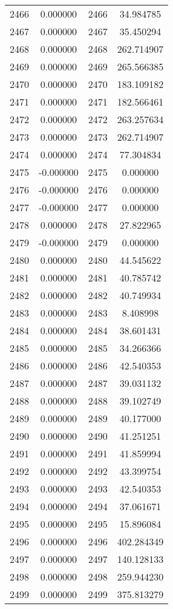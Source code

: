 \documentclass[12pt]{article}
\begin{document}
\begin{longtable}{@{}cccc@{}}
2466 & 0.000000 & 2466 & 34.984785 \\
2467 & 0.000000 & 2467 & 35.450294 \\
2468 & 0.000000 & 2468 & 262.714907 \\
2469 & 0.000000 & 2469 & 265.566385 \\
2470 & 0.000000 & 2470 & 183.109182 \\
2471 & 0.000000 & 2471 & 182.566461 \\
2472 & 0.000000 & 2472 & 263.257634 \\
2473 & 0.000000 & 2473 & 262.714907 \\
2474 & 0.000000 & 2474 & 77.304834 \\
2475 & -0.000000 & 2475 & 0.000000 \\
2476 & -0.000000 & 2476 & 0.000000 \\
2477 & -0.000000 & 2477 & 0.000000 \\
2478 & 0.000000 & 2478 & 27.822965 \\
2479 & -0.000000 & 2479 & 0.000000 \\
2480 & 0.000000 & 2480 & 44.545622 \\
2481 & 0.000000 & 2481 & 40.785742 \\
2482 & 0.000000 & 2482 & 40.749934 \\
2483 & 0.000000 & 2483 & 8.408998 \\
2484 & 0.000000 & 2484 & 38.601431 \\
2485 & 0.000000 & 2485 & 34.266366 \\
2486 & 0.000000 & 2486 & 42.540353 \\
2487 & 0.000000 & 2487 & 39.031132 \\
2488 & 0.000000 & 2488 & 39.102749 \\
2489 & 0.000000 & 2489 & 40.177000 \\
2490 & 0.000000 & 2490 & 41.251251 \\
2491 & 0.000000 & 2491 & 41.859994 \\
2492 & 0.000000 & 2492 & 43.399754 \\
2493 & 0.000000 & 2493 & 42.540353 \\
2494 & 0.000000 & 2494 & 37.061671 \\
2495 & 0.000000 & 2495 & 15.896084 \\
2496 & 0.000000 & 2496 & 402.284349 \\
2497 & 0.000000 & 2497 & 140.128133 \\
2498 & 0.000000 & 2498 & 259.944230 \\
2499 & 0.000000 & 2499 & 375.813279 \\

\end{longtable}
\end{document}
